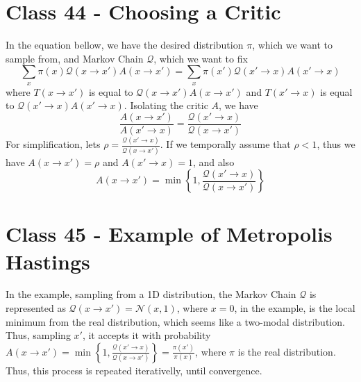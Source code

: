 \documentclass{article}
\begin{document}
\section{Class 44 - Choosing a Critic}
In the equation bellow, we have the desired distribution $\pi$, which we want to sample from, and Markov Chain $\mathcal{Q}$, which we want to fix
\begin{equation}
    \sum_x \pi(x)\mathcal{Q}(x \rightarrow x')A(x \rightarrow x') = \sum_x \pi(x')\mathcal{Q}(x' \rightarrow x)A(x' \rightarrow x) 
\end{equation}
where $T(x\rightarrow x')$ is equal to $\mathcal{Q}(x \rightarrow x')A(x \rightarrow x') $ and $T(x'\rightarrow x)$ is equal to $\mathcal{Q}(x' \rightarrow x)A(x' \rightarrow x)$. Isolating the critic $A$, we have
\begin{equation}
    \frac{A(x \rightarrow x')}{A(x' \rightarrow x)} = \frac{\mathcal{Q}(x' \rightarrow x)}{\mathcal{Q}(x \rightarrow x')}
\end{equation}
For simplification, lets $\rho = \frac{\mathcal{Q}(x' \rightarrow x)}{\mathcal{Q}(x \rightarrow x')}$. If we temporally assume that $\rho < 1$, thus we have $A(x \rightarrow x') = \rho$ and $A(x' \rightarrow x) = 1$, and also
\begin{equation}
    A(x \rightarrow x') = \min \left\{1, \frac{\mathcal{Q}(x' \rightarrow x)}{\mathcal{Q}(x \rightarrow x')} \right\}
\end{equation}

\section{Class 45 - Example of Metropolis Hastings}
In the example, sampling from a 1D distribution, the Markov Chain $\mathcal{Q}$ is represented as $\mathcal{Q}(x \rightarrow x') = \mathcal{N}(x, 1)$, where $x = 0$, in the example, is the local minimum from the real distribution, which seems like a two-modal distribution. Thus, sampling $x'$, it accepts it with probability $A(x \rightarrow x') = \min \left\{1, \frac{\mathcal{Q}(x' \rightarrow x)}{\mathcal{Q}(x \rightarrow x')} \right\} = \frac{\pi(x')}{\pi(x)}$, where $\pi$ is the real distribution. Thus, this process is repeated iterativelly, until convergence.
\end{document}
